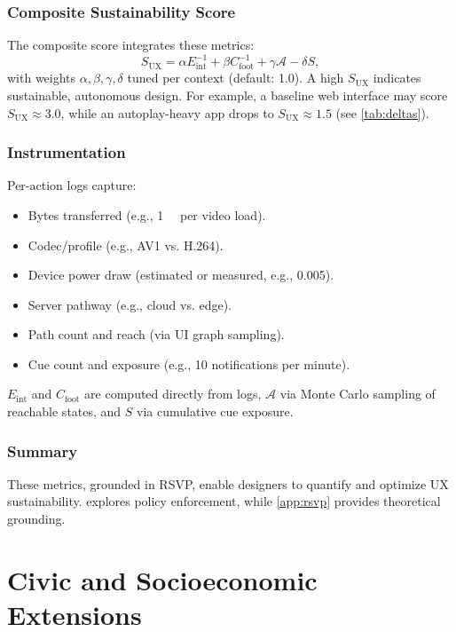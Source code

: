 \documentclass[openany]{book}
\newcommand{\Sent}{S} %
\newcommand{\Eint}{E_{\mathrm{int}}} %
\newcommand{\Cfoot}{C_{\mathrm{foot}}} %
\newcommand{\Auton}{\mathcal{A}} %
\newcommand{\SUX}{S_{\mathrm{UX}}} %
\newcommand{\kWh}{\mathrm{kWh}}
\begin{document}
\section{Composite Sustainability Score}
\label{sec:metrics-composite}
The composite score integrates these metrics:
\begin{equation}
\label{eq:metrics-SUX}
\SUX = \alpha \Eint^{-1} + \beta \Cfoot^{-1} + \gamma \Auton - \delta \Sent,
\end{equation}
with weights $\alpha, \beta, \gamma, \delta$ tuned per context (default: 1.0). A high $\SUX$ indicates sustainable, autonomous design. For example, a baseline web interface may score $\SUX \approx 3.0$, while an autoplay-heavy app drops to $\SUX \approx 1.5$ (see \cref{tab:deltas}).

\section{Instrumentation}
\label{sec:instrumentation}
Per-action logs capture:
\begin{itemize}
  \item Bytes transferred (e.g., \SI{1}{\mega\byte} per video load).
  \item Codec/profile (e.g., AV1 vs. H.264).
  \item Device power draw (estimated or measured, e.g., \SI{0.005}{\kWh}).
  \item Server pathway (e.g., cloud vs. edge).
  \item Path count and reach (via UI graph sampling).
  \item Cue count and exposure (e.g., 10 notifications per minute).
\end{itemize}
$\Eint$ and $\Cfoot$ are computed directly from logs, $\Auton$ via Monte Carlo sampling of reachable states, and $\Sent$ via cumulative cue exposure.

\section{Summary}
These metrics, grounded in RSVP, enable designers to quantify and optimize UX sustainability.  explores policy enforcement, while \cref{app:rsvp} provides theoretical grounding.

\part{Civic and Socioeconomic Extensions}
\end{document}
